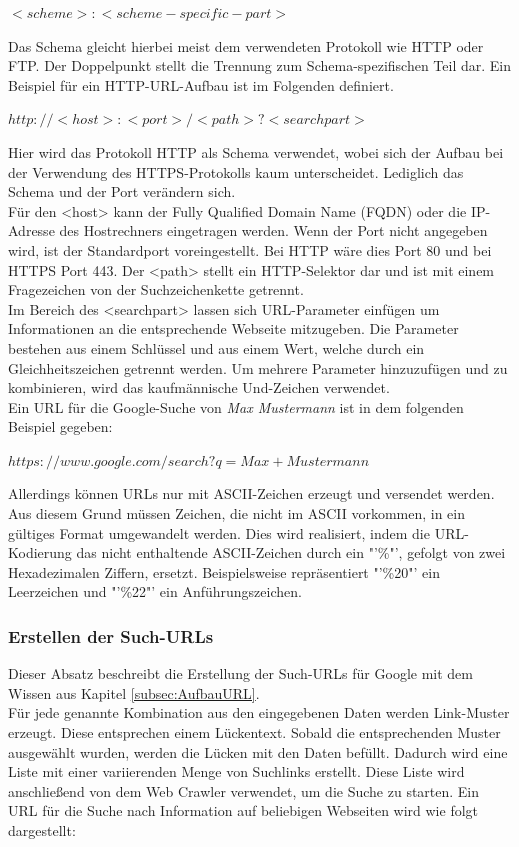 			$<scheme>:<scheme-specific-part>$ \cite{RFC1738}
			
			Das Schema gleicht hierbei meist dem verwendeten Protokoll wie HTTP oder FTP. Der Doppelpunkt stellt die Trennung zum Schema-spezifischen Teil dar. Ein Beispiel für ein HTTP-URL-Aufbau ist im Folgenden definiert.\cite{RFC1738}
			
			$http://<host>:<port>/<path>?<searchpart>$\cite{RFC1738}
			
			Hier wird das Protokoll HTTP als Schema verwendet, wobei sich der Aufbau bei der Verwendung des HTTPS-Protokolls kaum unterscheidet. Lediglich das Schema und der Port verändern sich.\\
			Für den <host> kann der Fully Qualified Domain Name (FQDN) oder die IP-Adresse des Hostrechners eingetragen werden. Wenn der Port nicht angegeben wird, ist der Standardport voreingestellt. Bei HTTP wäre dies Port 80 und bei HTTPS Port 443. Der <path> stellt ein HTTP-Selektor dar und ist mit einem Fragezeichen von der Suchzeichenkette getrennt.\cite{RFC1738}\\
			Im Bereich des <searchpart> lassen sich URL-Parameter einfügen um Informationen an die entsprechende Webseite mitzugeben. Die Parameter bestehen aus einem Schlüssel und aus einem Wert, welche durch ein Gleichheitszeichen getrennt werden. Um mehrere Parameter hinzuzufügen und zu kombinieren, wird das kaufmännische Und-Zeichen verwendet.\cite{GoogleURL}\\
			Ein URL für die Google-Suche von \textit{Max Mustermann} ist in dem folgenden Beispiel gegeben:
			
			$https://www.google.com/search?q=Max+Mustermann$
			
			Allerdings können URLs nur mit ASCII-Zeichen erzeugt und versendet werden. Aus diesem Grund müssen Zeichen, die nicht im ASCII vorkommen, in ein gültiges Format umgewandelt werden. Dies wird realisiert, indem die URL-Kodierung das nicht enthaltende ASCII-Zeichen durch ein "'\%"', gefolgt von zwei Hexadezimalen Ziffern, ersetzt. Beispielsweise repräsentiert "'\%20"' ein Leerzeichen und "'\%22"' ein Anführungszeichen. \cite{HTMLURL} \\
			
			\subsubsection{Erstellen der Such-URLs}
			Dieser Absatz beschreibt die Erstellung der Such-URLs für Google mit dem Wissen aus Kapitel \ref{subsec:AufbauURL}.\\
			Für jede genannte Kombination aus den eingegebenen Daten werden Link-Muster erzeugt. Diese entsprechen einem Lückentext. Sobald die entsprechenden Muster ausgewählt wurden, werden die Lücken mit den Daten befüllt. Dadurch wird eine Liste mit einer variierenden Menge von Suchlinks erstellt. Diese Liste wird anschließend von dem Web Crawler verwendet, um die Suche zu starten.
			Ein URL für die Suche nach Information auf beliebigen Webseiten wird wie folgt dargestellt:
					

